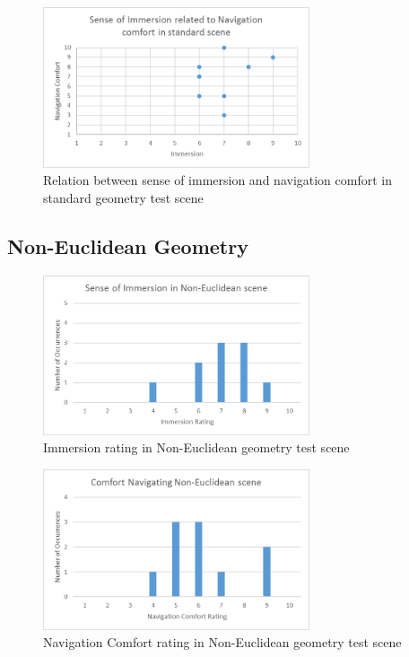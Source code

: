 			\begin{figure}[H]
				\includegraphics[width=0.7\textwidth]{Images/Standard_Relation}
				\centering
				\caption{Relation between sense of immersion and navigation comfort in standard geometry test scene}
				\label{exp:fig:standard_relation}
			\end{figure}

		\subsection{Non-Euclidean Geometry}
		\label{exp:exp:ne}


			\begin{figure}[H]
				\includegraphics[width=0.7\textwidth]{Images/NE_Immersion}
				\centering
				\caption{Immersion rating in Non-Euclidean geometry test scene}
				\label{exp:fig:ne_immersion}
			\end{figure}

			\begin{figure}[H]
				\includegraphics[width=0.7\textwidth]{Images/NE_Comfort}
				\centering
				\caption{Navigation Comfort rating in Non-Euclidean geometry test scene}
				\label{exp:fig:ne_comfort}
			\end{figure}

